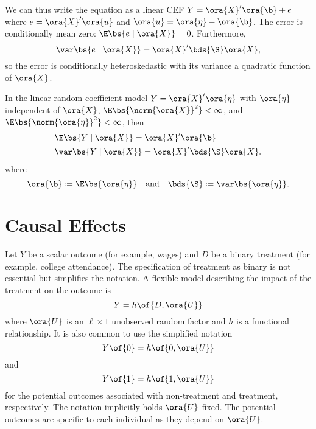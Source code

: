 We can thus write the equation as a linear CEF $Y = \ora{X}^{\prime}\ora{\b} + e$ where $e = \ora{X}^{\prime} \ora{u}$ and $\ora{u} = \ora{\eta} - \ora{\b}$. The error is conditionally mean zero: $\E\bs{{e} \mid \ora{X}} = {0}$. Furthermore, 
\begin{equation}
    \notag 
    \var\bs{{e} \mid \ora{X}} = \ora{X}^{\prime} \bds{\S} \ora{X},
\end{equation}
so the error is conditionally heteroskedastic with its variance a quadratic function of $\ora{X}$.

\begin{theorem}
    \label{hansen_thm_2_11}
    In the linear random coefficient model $Y = \ora{X}^{\prime} \ora{\eta}$ with $\ora{\eta}$ independent of $\ora{X}$, $\E\bs{\norm{\ora{X}}^2} < \infty$, and $\E\bs{\norm{\ora{\eta}}^2} < \infty$, then 
    \begin{equation}
        \notag 
        \begin{aligned}
            & \E\bs{Y \mid \ora{X}} = \ora{X}^{\prime} \ora{\b} \\
            & \var\bs{Y \mid \ora{X}} = \ora{X}^{\prime} \bds{\S} \ora{X}.
        \end{aligned}
    \end{equation}
    where 
    $$
    \ora{\b} \coloneqq \E\bs{\ora{\eta}} \quad \text{and} \quad \bds{\S} \coloneqq \var\bs{\ora{\eta}}.
    $$
\end{theorem}

\section{Causal Effects}
\setcounter{equation}{51}
\setcounter{definition}{5}

Let $Y$ be a scalar outcome (for example, wages) and $D$ be a binary treatment (for example, college attendance). The specification of treatment as binary is not essential but simplifies the
notation. A flexible model describing the impact of the treatment on the outcome is 
\begin{equation}
    \label{2.52}
    Y = h\of{D, \ora{U}}
\end{equation}
where $\ora{U}$ is an $\ell \times 1$ unobserved random factor and $h$ is a functional relationship. It is also common to use the simplified notation $$Y\of{0} = h\of{0, \ora{U}}$$ and $$Y\of{1} = h\of{1, \ora{U}}$$ for the potential outcomes associated with non-treatment and treatment, respectively. The notation implicitly holds $\ora{U}$ fixed. The potential outcomes are specific to each individual as they depend on $\ora{U}$.

